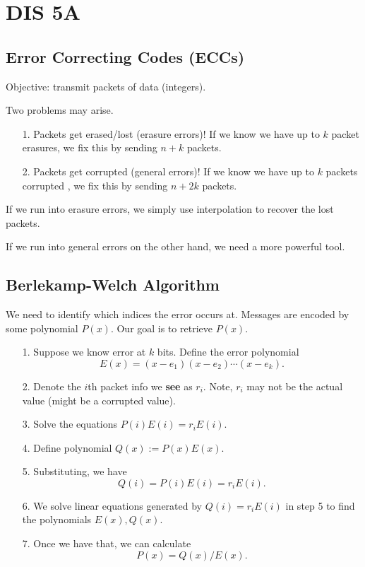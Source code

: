 \section{DIS 5A}

\subsection{Error Correcting Codes (ECCs)}
Objective: transmit packets of data (integers). 

Two problems may arise. 

\begin{itemize}
    \item[1.] Packets get erased/lost (erasure errors)! If we know we have up to $k$ packet erasures, we fix this by sending $n+k$ packets. 
    \item[2.] Packets get corrupted (general errors)! If we know we have up to $k$ packets corrupted , we fix this by sending $n+2k$ packets. 
\end{itemize}

If we run into erasure errors, we simply use interpolation to recover the lost packets. 

If we run into general errors on the other hand, we need a more powerful tool. 

\subsection{Berlekamp-Welch Algorithm}
We need to identify which indices the error occurs at. Messages are encoded by some polynomial $P(x)$. Our goal is to retrieve $P(x)$. 
\begin{itemize}
    \item[1.] Suppose we know error at $k$ bits. Define the error polynomial \[ E(x) = (x-e_1)(x-e_2)\cdots(x-e_k). \]
    \item[2.] Denote the $i$th packet info we \textbf{see} as $r_i$. Note, $r_i$ may not be the actual value (might be a corrupted value). 
    \item[3.] Solve the equations $P(i)E(i) = r_i E(i)$. 
    \item[4.] Define polynomial $Q(x) := P(x)E(x)$. 
    \item[5.] Substituting, we have \[Q(i) =  P(i) E(i) = r_i E(i). \] 
    \item[6.] We solve linear equations generated by $Q(i) = r_i E(i)$ in step 5 to find the polynomials $E(x), Q(x)$. 
    \item[7.] Once we have that, we can calculate \[ P(x) = Q(x) / E(x). \] 
\end{itemize}
